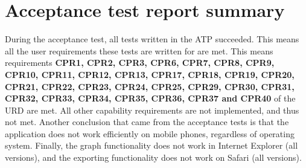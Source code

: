 \chapter{Acceptance test report summary}
\label{chap:testreports}

During the acceptance test, all tests written in the ATP\cite{atp} succeeded. This means all the user requirements these tests are written for are met. This means requirements \textbf{CPR1, CPR2, CPR3, CPR6, CPR7, CPR8, CPR9, CPR10, CPR11, CPR12, CPR13, CPR17, CPR18, CPR19, CPR20, CPR21, CPR22, CPR23, CPR24, CPR25, CPR29, CPR30, CPR31, CPR32, CPR33, CPR34, CPR35, CPR36, CPR37 and CPR40} of the URD\cite{urd} are met. All other capability requirements are not implemented, and thus not met. Another conclusion that came from the acceptance tests is that the application does not work efficiently on mobile phones, regardless of operating system. Finally, the graph functionality does not work in Internet Explorer (all versions), and the exporting functionality does not work on Safari (all versions).

